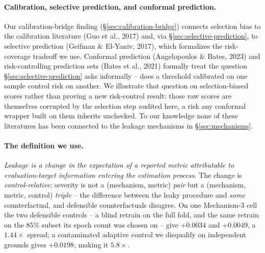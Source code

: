 \documentclass{article}
\begin{document}
\paragraph{Calibration, selective prediction, and conformal prediction.}
Our calibration-bridge finding (\S\ref{sec:calibration-bridge}) connects
selection bias to the calibration literature (Guo et al., 2017) and, via
\S\ref{sec:selective-prediction}, to selective prediction (Geifman \&
El-Yaniv, 2017), which formalizes the risk-coverage tradeoff we use.
Conformal prediction (Angelopoulos \& Bates, 2023) and risk-controlling
prediction sets (Bates et al., 2021) formally treat the question
\S\ref{sec:selective-prediction} asks informally -- does a threshold
calibrated on one sample control risk on another. We illustrate that question
on selection-biased scores rather than proving a new risk-control result: those
raw scores are themselves corrupted by the selection step audited here, a risk
any conformal wrapper built on them inherits unchecked. To our knowledge none
of these literatures has been connected to the leakage mechanisms in
\S\ref{sec:mechanisms}.

\paragraph{The definition we use.} \emph{Leakage is a change in the
expectation of a reported metric attributable to evaluation-target
information entering the estimation process.} The change is
\emph{control-relative}: severity is not a (mechanism, metric) \emph{pair}
but a (mechanism, metric, control) \emph{triple} -- the difference between
the leaky procedure and \emph{some} counterfactual, and defensible
counterfactuals disagree. On one Mechanism-3 cell the two defensible
controls -- a blind retrain on the full fold, and the same retrain on the
$85\%$ subset its epoch count was chosen on -- give $+0.0034$ and $+0.0049$,
a $1.44\times$ spread; a contaminated adaptive control we disqualify on
independent grounds gives $+0.0198$, making it $5.8\times$.
\end{document}

